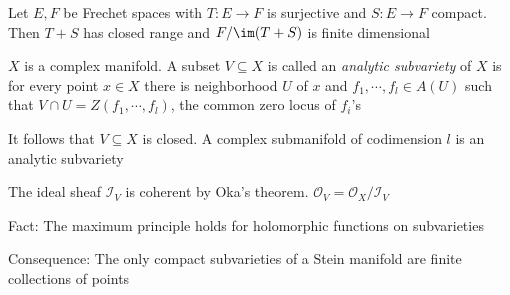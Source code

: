 \documentclass[../main.tex]{subfiles}
\begin{document}
\begin{theorem}\label{Schwartz theorem}
Let $E,F$ be Frechet spaces with $T:E\to F$ is surjective and $S:E\to F$ compact. Then $T+S$ has closed range and $F/\im(T+S)$ is finite dimensional
\end{theorem}

\begin{definition}
$X$ is a complex manifold. A subset $V\subseteq X$ is called an \textit{analytic subvariety} of $X$ is for every point $x\in X$ there is neighborhood $U$ of $x$ and $f_1,\cdots,f_l\in A(U)$ such that $V\cap U=Z(f_1,\cdots,f_l)$, the common zero locus of $f_i$'s
\end{definition}

It follows that $V\subseteq X$ is closed. A complex submanifold of codimension $l$ is an analytic subvariety

The ideal sheaf $\mathcal I_V$ is coherent by Oka's theorem. $\mathcal O_V=\mathcal O_X/\mathcal I_V$

Fact: The maximum principle holds for holomorphic functions on subvarieties

Consequence: The only compact subvarieties of a Stein manifold are finite collections of points
\end{document}

